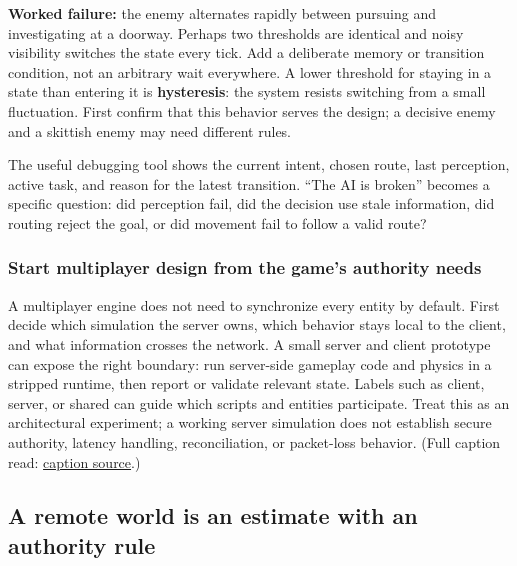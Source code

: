 \textbf{Worked failure:} the enemy alternates rapidly between pursuing and investigating at a doorway. Perhaps two thresholds are identical and noisy visibility switches the state every tick. Add a deliberate memory or transition condition, not an arbitrary wait everywhere. A lower threshold for staying in a state than entering it is \textbf{hysteresis}: the system resists switching from a small fluctuation. First confirm that this behavior serves the design; a decisive enemy and a skittish enemy may need different rules.

The useful debugging tool shows the current intent, chosen route, last perception, active task, and reason for the latest transition. ``The AI is broken'' becomes a specific question: did perception fail, did the decision use stale information, did routing reject the goal, or did movement fail to follow a valid route?

\subsubsection{Start multiplayer design from the game's authority needs}\label{06-engine-ii-ch040-start-multiplayer-design-from-the-games-authority-needs}

\hypertarget{06-engine-ii-ch040-start-multiplayer-design-from-the-games-authority-needs}{}

A multiplayer engine does not need to synchronize every entity by default. First decide which simulation the server owns, which behavior stays local to the client, and what information crosses the network. A small server and client prototype can expose the right boundary: run server-side gameplay code and physics in a stripped runtime, then report or validate relevant state. Labels such as client, server, or shared can guide which scripts and entities participate. Treat this as an architectural experiment; a working server simulation does not establish secure authority, latency handling, reconciliation, or packet-loss behavior. (Full caption read: \href{https://www.youtube.com/watch?v=miNInZ806a0}{caption source}.)

\subsection{A remote world is an estimate with an authority rule}\label{06-engine-ii-ch040-a-remote-world-is-an-estimate-with-an-authority-rule}

\hypertarget{06-engine-ii-ch040-a-remote-world-is-an-estimate-with-an-authority-rule}{}

